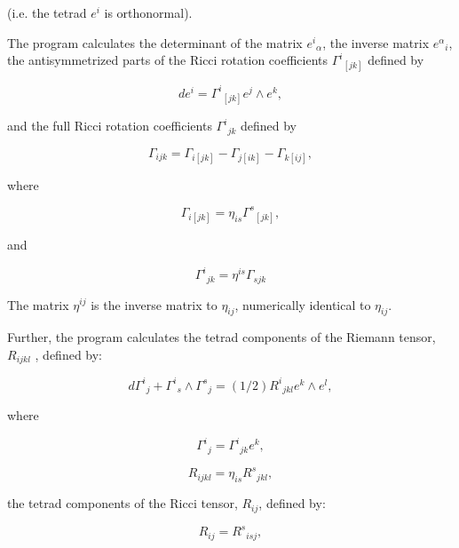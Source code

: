 \noindent (i.e. the tetrad $e^i$  is orthonormal).

The program calculates the determinant  of  the  matrix ${e^i}_{\alpha}$, the
inverse  matrix ${e^{\alpha}}_i$,  the  antisymmetrized parts of the Ricci
rotation coefficients  ${\Gamma^i}_{[jk]}$ defined by

\begin{equation}
de^i = {\Gamma^i}_{[jk]} e^j \wedge e^k ,
\end{equation}

\noindent and the full Ricci rotation coefficients ${\Gamma^i}_{jk}$ defined by

\begin{equation}
\Gamma_{ijk} = \Gamma_{i[jk]} - \Gamma_{j[ik]} - \Gamma_{k[ij]} ,
\end{equation}

\noindent where

\begin{equation}
\Gamma_{i[jk]} = \eta_{is}{\Gamma^s}_{[jk]} ,
\end{equation}

\noindent and

\begin{equation}
{\Gamma^i}_{jk} = \eta^{is} \Gamma_{sjk}
\end{equation}

\noindent The matrix $\eta^{ij}$ is the inverse  matrix  to $\eta_{ij}$,
numerically identical to $\eta_{ij}$.

Further, the program calculates the tetrad  components of the Riemann tensor,
$R_{ijkl}$ , defined by:

\begin{equation}
d{\Gamma^i}_j + {\Gamma^i}_s \wedge {\Gamma^s}_j = (1/2){R^i}_{jkl} e^k \wedge
e^l ,
\end{equation}

\noindent where

\begin{equation}
{\Gamma^i}_j = {\Gamma^i}_{jk} e^k ,
\end{equation}

\begin{equation}
R_{ijkl} = \eta_{is} {R^s}_{jkl} ,
\end{equation}

\noindent the tetrad components of the Ricci tensor, $R_{ij}$, defined by:

\begin{equation}
R_{ij} = {R^s}_{isj} ,
\end{equation}

